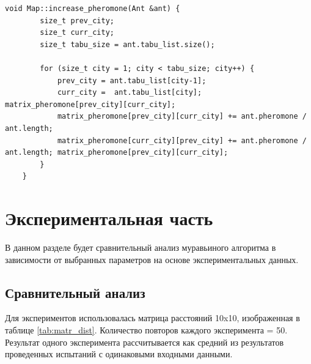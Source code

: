 \documentclass[a4paper, 14pt]{article}
\begin{document}
	\begin{lstlisting}[label=code:increase_pheromone,caption=Функция increase\_pheromone - увеличивает количество феромонов для пройденных муравьем городов ]
        void Map::increase_pheromone(Ant &ant) {
        size_t prev_city;
        size_t curr_city;
        size_t tabu_size = ant.tabu_list.size();
    
        for (size_t city = 1; city < tabu_size; city++) {
            prev_city = ant.tabu_list[city-1];
            curr_city =  ant.tabu_list[city]; matrix_pheromone[prev_city][curr_city];
            matrix_pheromone[prev_city][curr_city] += ant.pheromone / ant.length;
            matrix_pheromone[curr_city][prev_city] += ant.pheromone / ant.length; matrix_pheromone[prev_city][curr_city];
        }
    }
	\end{lstlisting}
	

	
    \newpage
	\section{Экспериментальная часть}
	\hspace{1cm} В данном разделе будет сравнительный анализ муравьиного алгоритма в зависимости от выбранных параметров на основе экспериментальных данных.
      
    \subsection{Сравнительный анализ}
    \hspace{1cm}Для экспериментов использовалась матрица расстояний 10x10, изображенная в таблице \ref{tab:matr_dist}. Количество повторов каждого эксперимента = 50. Результат одного эксперимента рассчитывается как средний из результатов проведенных испытаний с одинаковыми входными данными.
         
\end{document}
